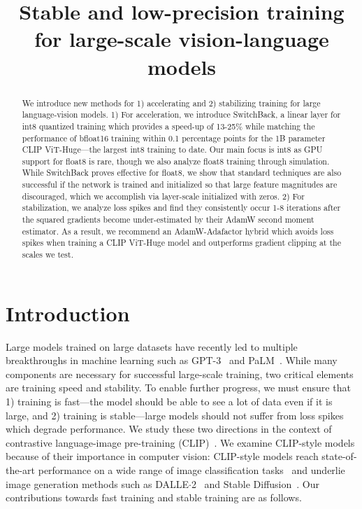 \title{Stable and low-precision training for large-scale vision-language models}

\begin{abstract}
We introduce new methods for 1) accelerating and 2) stabilizing training for large language-vision models. 1) For acceleration, we introduce SwitchBack, a linear layer for int8 quantized training which provides a speed-up of 13-25\% while matching the performance of bfloat16 training within 0.1 percentage points for the 1B parameter CLIP ViT-Huge---the largest int8 training to date. Our main focus is int8 as GPU support for float8 is rare, though we also analyze float8 training through simulation. While SwitchBack proves effective for float8, we show that standard techniques are also successful if the network is trained and initialized so that large feature magnitudes are discouraged, which we accomplish via layer-scale initialized with zeros. 2) For stabilization, we analyze loss spikes and find they consistently occur 1-8 iterations after the squared gradients become under-estimated by their AdamW second moment estimator. As a result, we recommend an AdamW-Adafactor hybrid which avoids loss spikes when training a CLIP ViT-Huge model and outperforms gradient clipping at the scales we test.
\end{abstract}

\section{Introduction}

Large models trained on large datasets have recently led to multiple breakthroughs in machine learning such as GPT-3~\cite{brown2020language} and PaLM~\cite{chowdhery2022palm}. While many components are necessary for successful large-scale training, two critical elements are training speed and stability. To enable further progress, we must ensure that 1) training is fast---the model should be able to see a lot of data even if it is large, and  2) training is stable---large models should not suffer from loss spikes which degrade performance. We study these two directions in the context of contrastive language-image pre-training (CLIP)~\cite{radford2021learning}. We examine CLIP-style models because of their importance in computer vision: CLIP-style models reach state-of-the-art performance on a wide range of image classification tasks~\cite{radford2021learning, wortsman2022model, pham2021scaling, chen2023symbolic} and underlie image generation methods such as DALLE$\cdot$2~\cite{ramesh2022hierarchical} and Stable Diffusion~\cite{rombach2022high}. Our contributions towards fast training and stable training are as follows.

